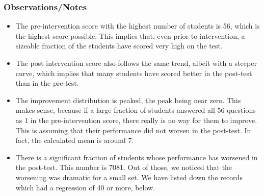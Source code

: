 \documentclass[10pt]{article}
\begin{document}
\subsubsection{Observations/Notes}
\begin{itemize}
\item The pre-intervention score with the highest number of students is 56, which is the highest score possible. This implies that, even prior to intervention, a sizeable fraction of the students have scored very high on the test.
\item The post-intervention score also follows the same trend, albeit with a steeper curve, which implies that many students have scored better in the post-test than in the pre-test.
\item The improvement distribution is peaked, the peak being near zero. This makes sense, because if a large fraction of students answered all 56 questions as 1 in the pre-intervention score, there really is no way for them to improve. This is assuming that their performance did not worsen in the post-test. In fact, the calculated mean is around 7.
\item There is a significant fraction of students whose performance has worsened in the post-test. This number is 7081. Out of those, we noticed that the worsening was dramatic for a small set. We have listed down the records which had a regression of 40 or more, below.


\end{itemize}
\end{document}
